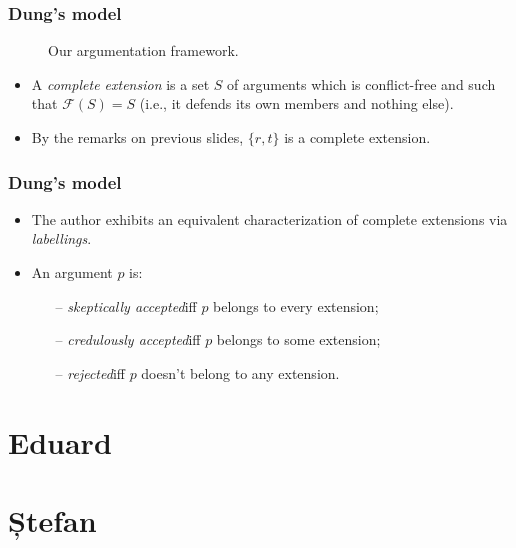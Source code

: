 \documentclass{beamer}
\begin{document}
\begin{frame}
\frametitle{Dung's model}
\begin{figure}
\centering
{}
\caption{Our argumentation framework.} \label{af}
\end{figure}
\begin{itemize}
\item A \emph{complete extension} is a set $S$ of arguments which is conflict-free and such that \( \mathcal{F}(S) = S \) (i.e., it defends its own members and nothing else). \pause
\item By the remarks on previous slides, $\{ r, t \}$ is a complete extension.
\end{itemize}
\end{frame}

\begin{frame}
\frametitle{Dung's model}
\begin{itemize}
\item The author exhibits an equivalent characterization of complete extensions via \emph{labellings}. \pause
\item An argument $p$ is:
  \begin{itemize}
  \item[--] \emph{skeptically accepted}\quad iff $p$ belongs to every extension;
  \item[--] \emph{credulously accepted}\quad iff $p$ belongs to some extension;
  \item[--] \emph{rejected}\quad iff $p$ doesn't belong to any extension. 
  \end{itemize}
\end{itemize}
\end{frame}


\section{Eduard}

\section{Ștefan}
\end{document}
